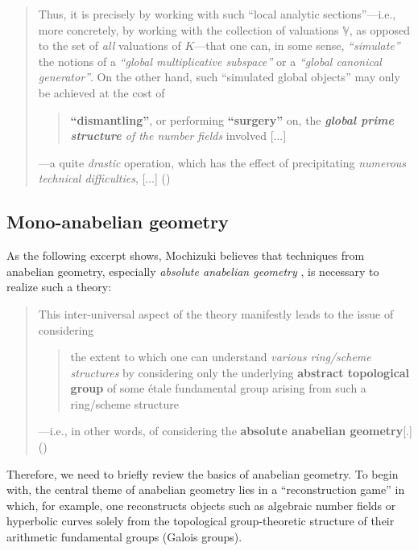 \documentclass[12pt, reqno, a4paper]{amsart}
\def\udl#1{\underline{#1}} %
\def\bV{\mathbb{V}}
\def\uV{\udl{\bV}} %
\begin{document}
\medskip
\begin{quote}
Thus, it is precisely by working with
such ``local analytic sections''---i.e., more concretely, by working
with the collection of valuations $\uV$, as opposed to the set of
{\it all} valuations of $K$---that one can, in some sense, {\it
``simulate''} the notions of a {\it ``global multiplicative
subspace''} or a {\it ``global canonical generator''}.  On the other
hand, such ``simulated global objects'' may only be achieved at the
cost of

\medskip
\begin{quote}
{\bf ``dismantling''}, or performing {\bf ``surgery''} on, the
{\it {\bf global prime structure} of the number fields} involved [...]
\end{quote}

\medskip
---a quite {\it drastic} operation, which has the effect of
precipitating {\it numerous technical difficulties}, [...] (\cite[Introduction, pp.\ 12--13]{MR4225473})
\end{quote}


\subsection{Mono-anabelian geometry}\label{sub:monoAnabelilanGeom}
As the following excerpt shows, Mochizuki believes that techniques from anabelian geometry, especially {\it absolute anabelian geometry} \cite{MR2987306,MR3154380,MR3445958}, is necessary to realize such a theory:

\medskip
\begin{quote}
This inter-universal
aspect of the theory manifestly leads to the issue of considering 

\medskip
\begin{quote}
the extent to which one can understand {\it various ring/scheme
structures} by considering only the underlying {\bf abstract
topological group} of some \'etale fundamental group arising from such 
a ring/scheme structure 
\end{quote}

\medskip
---i.e., in other words, of considering the {\bf absolute anabelian
geometry}[.] (\cite[\S I3, p.\ 26]{MR4225473})
\end{quote}

\medskip
Therefore, we need to briefly review the basics of anabelian geometry.
To begin with, the central theme of anabelian geometry lies in a ``reconstruction game'' in which, for example, one reconstructs objects such as algebraic number fields or hyperbolic curves solely from the topological group-theoretic structure of their arithmetic fundamental groups (Galois groups).
\end{document}

